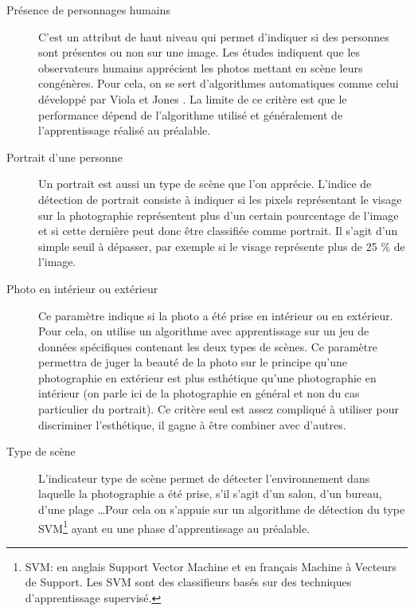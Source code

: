 \documentclass[11pt, french]{report-rd-info}
\begin{document}
\begin{description}
\item[Présence de personnages humains]
C’est un attribut de haut niveau qui permet d’indiquer si des personnes sont présentes ou non sur une image. Les études indiquent que les observateurs humains apprécient les photos mettant en scène leurs congénères. Pour cela, on se sert d’algorithmes automatiques comme celui développé par Viola et Jones \cite{Viola2004}. La limite de ce critère est que le performance dépend de l’algorithme utilisé et généralement de l’apprentissage réalisé au préalable.
\item[Portrait d'une personne]
Un portrait est aussi un type de scène que l’on apprécie. L’indice de détection de portrait consiste à indiquer si les pixels représentant le visage sur la photographie représentent plus d’un certain pourcentage de l’image et si cette dernière peut donc être classifiée comme portrait. Il s’agit d’un simple seuil à dépasser, par exemple si le visage représente plus de 25 \% de l’image.
\item[Photo en intérieur ou extérieur]
Ce paramètre indique si la photo a été prise en intérieur ou en extérieur. Pour cela, on utilise un algorithme avec apprentissage sur un jeu de données spécifiques contenant les deux types de scènes. Ce paramètre permettra de juger la beauté de la photo sur le principe qu’une photographie en extérieur est plus esthétique qu’une photographie en intérieur (on parle ici de la photographie en général et non du cas particulier du portrait). Ce critère seul est assez compliqué à utiliser pour discriminer l’esthétique, il gagne à être combiner avec d’autres.
\item[Type de scène]
L’indicateur type de scène permet de détecter l’environnement dans laquelle la photographie a été prise, s’il s’agit d’un salon, d’un bureau, d’une plage \ldots Pour cela on s’appuie sur un algorithme de détection du type SVM\footnote{SVM: en anglais Support Vector Machine et en français Machine à Vecteurs de Support. Les SVM sont des classifieurs basés sur des techniques d'apprentissage supervisé.} ayant eu une phase d’apprentissage au préalable.
\end{description}
\end{document}
